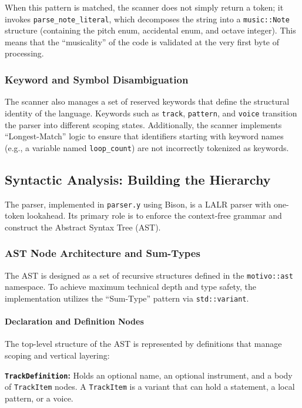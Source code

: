 When this pattern is matched, the scanner does not simply return a token; it invokes
\texttt{parse\_note\_literal}, which
decomposes the string into a \texttt{music::Note} structure (containing the pitch enum, accidental enum, and octave
integer).
This means that the ``musicality'' of the code is validated at the very first byte of processing.

\subsubsection{Keyword and Symbol Disambiguation}

The scanner also manages a set of reserved keywords that define the structural identity of the language.
Keywords such as \texttt{track}, \texttt{pattern}, and \texttt{voice} transition the parser into different scoping
states.
Additionally, the scanner implements ``Longest-Match'' logic to ensure that identifiers starting with keyword names
(e.g., a variable named \texttt{loop\_count}) are not incorrectly tokenized as keywords.

\subsection{Syntactic Analysis: Building the Hierarchy}\label{detail-subsec:syntactic-analysis:-building-the-hierarchy}

The parser, implemented in \texttt{parser.y} using Bison, is a LALR parser with one-token lookahead.
Its primary role is to enforce the context-free grammar and construct the Abstract Syntax Tree (AST).

\subsubsection{AST Node Architecture and Sum-Types}

The AST is designed as a set of recursive structures defined in the \texttt{motivo::ast} namespace.
To achieve maximum technical depth and type safety, the implementation utilizes the ``Sum-Type'' pattern via
\texttt{std::variant}.

\paragraph{Declaration and Definition Nodes}
The top-level structure of the AST is represented by definitions that manage scoping and vertical layering:

\noindent \textbf{\texttt{TrackDefinition}:} Holds an optional name, an optional instrument, and a body of
\texttt{TrackItem} nodes.
A \texttt{TrackItem} is a variant that can hold a statement, a local pattern, or a voice.

